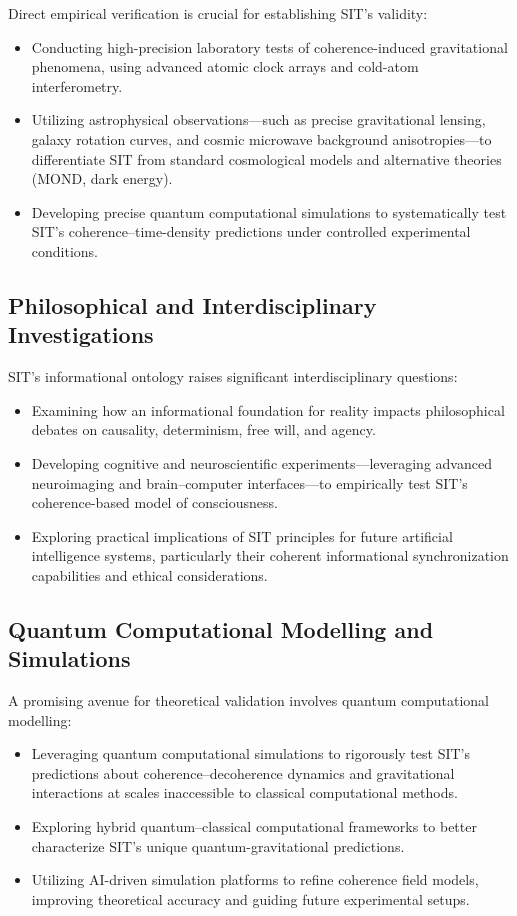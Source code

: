 \documentclass[american,11pt,letterpaper]{article}
\begin{document}
Direct empirical verification is crucial for establishing SIT's validity:
\begin{itemize}
    \item Conducting high-precision laboratory tests of coherence-induced gravitational phenomena, using advanced atomic clock arrays and cold-atom interferometry.
    \item Utilizing astrophysical observations---such as precise gravitational lensing, galaxy rotation curves, and cosmic microwave background anisotropies---to differentiate SIT from standard cosmological models and alternative theories (MOND, dark energy).
    \item Developing precise quantum computational simulations to systematically test SIT's coherence--time-density predictions under controlled experimental conditions.
\end{itemize}

\subsection{Philosophical and Interdisciplinary Investigations}

SIT's informational ontology raises significant interdisciplinary questions:
\begin{itemize}
    \item Examining how an informational foundation for reality impacts philosophical debates on causality, determinism, free will, and agency.
    \item Developing cognitive and neuroscientific experiments---leveraging advanced neuroimaging and brain--computer interfaces---to empirically test SIT's coherence-based model of consciousness.
    \item Exploring practical implications of SIT principles for future artificial intelligence systems, particularly their coherent informational synchronization capabilities and ethical considerations.
\end{itemize}

\subsection{Quantum Computational Modelling and Simulations}

A promising avenue for theoretical validation involves quantum computational modelling:
\begin{itemize}
    \item Leveraging quantum computational simulations to rigorously test SIT's predictions about coherence--decoherence dynamics and gravitational interactions at scales inaccessible to classical computational methods.
    \item Exploring hybrid quantum--classical computational frameworks to better characterize SIT's unique quantum-gravitational predictions.
    \item Utilizing AI-driven simulation platforms to refine coherence field models, improving theoretical accuracy and guiding future experimental setups.
\end{itemize}
\end{document}
